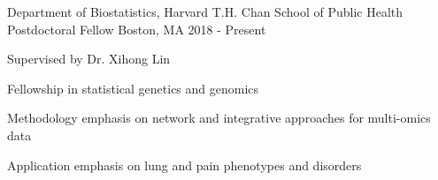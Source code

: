 

\begin{cventries}

  \cventry
    {Department of Biostatistics, Harvard T.H. Chan School of Public Health} %
    {Postdoctoral Fellow} %
    {Boston, MA} %
    {2018 - Present} %
    {
      \begin{cvitems} %
        \item {Supervised by Dr. Xihong Lin }
        \item {Fellowship in statistical genetics and genomics}
        \item {Methodology emphasis on network and integrative approaches for multi-omics data}
        \item {Application emphasis on lung and pain phenotypes and disorders}
      \end{cvitems}
    }

\end{cventries}
